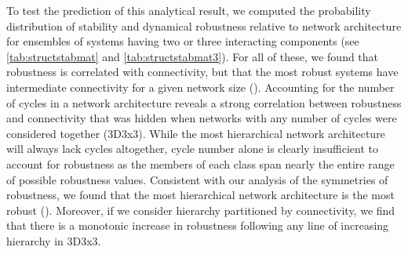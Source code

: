 To test the prediction of this analytical result, we computed the probability distribution of stability and dynamical robustness relative to network architecture for ensembles of systems having two or three interacting components (see \ref{tab:structstabmat} and \ref{tab:structstabmat3}). For all of these, we found that robustness is correlated with connectivity, but that the most robust systems have intermediate connectivity for a given network size (). Accounting for the number of cycles in a network architecture reveals a strong correlation between robustness and connectivity that was hidden when networks with any number of cycles were considered together (3D3x3). While the most hierarchical network architecture will always lack cycles altogether, cycle number alone is clearly insufficient to account for robustness as the members of each class span nearly the entire range of possible robustness values. Consistent with our analysis of the symmetries of robustness, we found that the most hierarchical network architecture is the most robust (). Moreover, if we consider hierarchy partitioned by connectivity, we find that there is a monotonic increase in robustness following any line of increasing hierarchy in 3D3x3.

